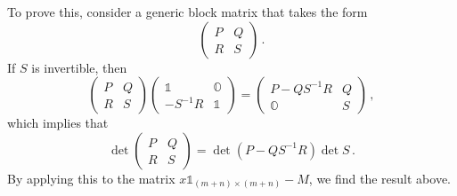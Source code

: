 \begin{subappendices}
To prove this, consider a generic block matrix that takes the form
\begin{equation}
    \begin{pmatrix}
        P & Q \\ R & S
    \end{pmatrix}\,.
\end{equation}
If $S$ is invertible, then
\begin{equation}
    \begin{pmatrix}
        P & Q \\ R & S
    \end{pmatrix}
    \begin{pmatrix} \mathbb{1} & \mathbb{O} \\ -S^{-1}R & \mathbb{1} 
    \end{pmatrix}
    =
    \begin{pmatrix} P-QS^{-1}R & Q \\ \mathbb{O} & S 
    \end{pmatrix}\,,
\end{equation}
which implies that 
\begin{equation}
    \det\begin{pmatrix} P & Q \\ R & S \end{pmatrix}=\det(P-QS^{-1}R) \det S \,.
\end{equation}
By applying this to the matrix $x\mathbb{1}_{(m+n)\times(m+n)}-M$, we find the result above.

\end{subappendices}